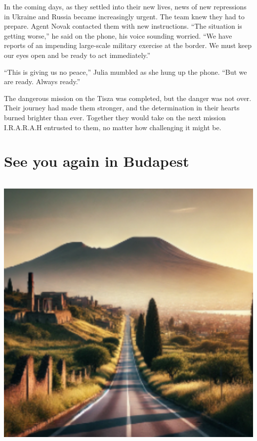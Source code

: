 \documentclass[
]{article}
\begin{document}
In the coming days, as they settled into their new lives, news of new
repressions in Ukraine and Russia became increasingly urgent. The team
knew they had to prepare. Agent Novak contacted them with new
instructions. ``The situation is getting worse,'' he said on the phone,
his voice sounding worried. ``We have reports of an impending
large-scale military exercise at the border. We must keep our eyes open
and be ready to act immediately.''

``This is giving us no peace,'' Julia mumbled as she hung up the phone.
``But we are ready. Always ready.''

The dangerous mission on the Tisza was completed, but the danger was not
over. Their journey had made them stronger, and the determination in
their hearts burned brighter than ever. Together they would take on the
next mission I.R.A.R.A.H entrusted to them, no matter how challenging it
might be.

\section{See you again in Budapest}\label{see-you-again-in-budapest}

\includegraphics[width=6in,height=5.58333in]{media/image2.png}
\end{document}
